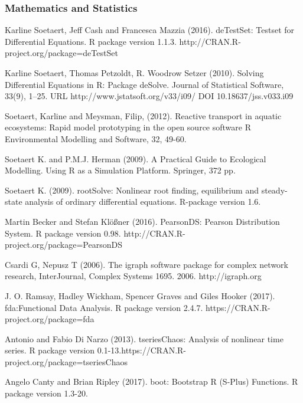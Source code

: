\documentclass[preprint, 8pt]{elsarticle}
\theoremstyle{definition}
\begin{document}
\begin{table}[H]
\begin{thebibliography}{00}
\subsubsection{Mathematics and Statistics}

 Karline Soetaert, Jeff Cash and Francesca Mazzia (2016). 
\newblock deTestSet: Testset for Differential Equations. R package version 1.1.3.
\newblock http://CRAN.R-project.org/package=deTestSet

Karline Soetaert, Thomas Petzoldt, R. Woodrow Setzer (2010). 
\newblock Solving Differential Equations in R: Package deSolve. 
\newblock Journal of Statistical Software, 33(9), 1--25. URL http://www.jstatsoft.org/v33/i09/ DOI 10.18637/jss.v033.i09

Soetaert, Karline and Meysman, Filip, (2012).
\newblock Reactive transport in aquatic ecosystems: Rapid model prototyping in the open source software R
\newblock Environmental Modelling and Software, 32, 49-60.

Soetaert K. and P.M.J. Herman (2009).  
\newblock A Practical Guide to Ecological Modelling. 
\newblock Using R as a Simulation Platform.  Springer, 372 pp.

Soetaert K. (2009).  
\newblock rootSolve: Nonlinear root finding, equilibrium and steady-state analysis of ordinary differential equations.  
\newblock R-package version 1.6.

Martin Becker and Stefan Klößner (2016). 
\newblock PearsonDS: Pearson Distribution System. 
\newblock R package version 0.98. http://CRAN.R-project.org/package=PearsonDS

Csardi G, Nepusz T (2006).
\newblock The igraph software package for complex network research,
\newblock  InterJournal, Complex Systems 1695. 2006. http://igraph.org

 J. O. Ramsay, Hadley Wickham, Spencer Graves and Giles Hooker (2017). 
\newblock fda:Functional Data Analysis. 
\newblock R package version 2.4.7. https://CRAN.R-project.org/package=fda

 Antonio and Fabio Di Narzo (2013).
\newblock tseriesChaos: Analysis of nonlinear time series. 
\newblock R package version 0.1-13.https://CRAN.R-project.org/package=tseriesChaos

 Angelo Canty and Brian Ripley (2017). 
\newblock boot: Bootstrap R (S-Plus) Functions. 
\newblock R package version 1.3-20.


\end{thebibliography}
\end{table}
\end{document}

